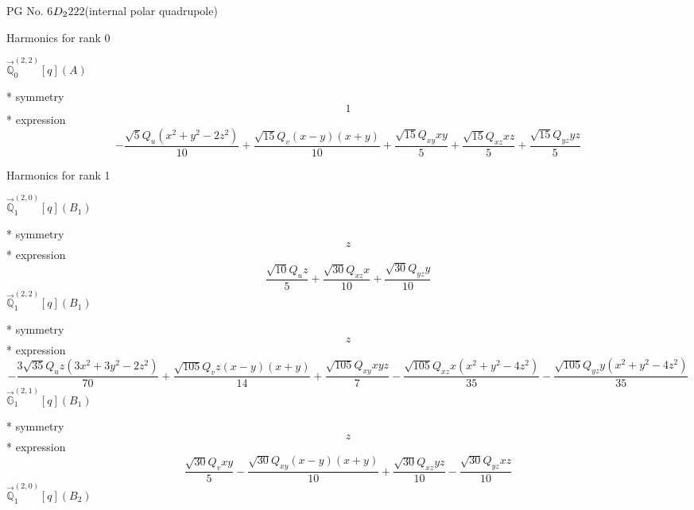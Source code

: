 \documentclass[fleqn,8pt]{jsarticle}
\begin{document}
\setcounter{MaxMatrixCols}{32}

\renewcommand{\tablename}{Table~}
\renewcommand{\figurename}{Figure~}
\begin{center}
\LARGE
PG No. 6\quad$D_{\rm 2}$\quad$222$\quad[ orthorhombic ] (internal polar quadrupole)
\end{center}

\noindent * Harmonics for rank 0

\noindent\quad $\vec{\mathbb{Q}}_{0}^{(2,2)}[q](A)$

\noindent\quad ** symmetry
\begin{dmath*}
1
\end{dmath*}
\noindent\quad ** expression
\begin{dmath*}
- \frac{\sqrt{5} Q_{u} \left(x^{2} + y^{2} - 2 z^{2}\right)}{10} + \frac{\sqrt{15} Q_{v} \left(x - y\right) \left(x + y\right)}{10} + \frac{\sqrt{15} Q_{xy} x y}{5} + \frac{\sqrt{15} Q_{xz} x z}{5} + \frac{\sqrt{15} Q_{yz} y z}{5}
\end{dmath*}

\noindent * Harmonics for rank 1

\noindent\quad $\vec{\mathbb{Q}}_{1}^{(2,0)}[q](B_{1})$

\noindent\quad ** symmetry
\begin{dmath*}
z
\end{dmath*}
\noindent\quad ** expression
\begin{dmath*}
\frac{\sqrt{10} Q_{u} z}{5} + \frac{\sqrt{30} Q_{xz} x}{10} + \frac{\sqrt{30} Q_{yz} y}{10}
\end{dmath*}
\noindent\quad $\vec{\mathbb{Q}}_{1}^{(2,2)}[q](B_{1})$

\noindent\quad ** symmetry
\begin{dmath*}
z
\end{dmath*}
\noindent\quad ** expression
\begin{dmath*}
- \frac{3 \sqrt{35} Q_{u} z \left(3 x^{2} + 3 y^{2} - 2 z^{2}\right)}{70} + \frac{\sqrt{105} Q_{v} z \left(x - y\right) \left(x + y\right)}{14} + \frac{\sqrt{105} Q_{xy} x y z}{7} - \frac{\sqrt{105} Q_{xz} x \left(x^{2} + y^{2} - 4 z^{2}\right)}{35} - \frac{\sqrt{105} Q_{yz} y \left(x^{2} + y^{2} - 4 z^{2}\right)}{35}
\end{dmath*}
\noindent\quad $\vec{\mathbb{G}}_{1}^{(2,1)}[q](B_{1})$

\noindent\quad ** symmetry
\begin{dmath*}
z
\end{dmath*}
\noindent\quad ** expression
\begin{dmath*}
\frac{\sqrt{30} Q_{v} x y}{5} - \frac{\sqrt{30} Q_{xy} \left(x - y\right) \left(x + y\right)}{10} + \frac{\sqrt{30} Q_{xz} y z}{10} - \frac{\sqrt{30} Q_{yz} x z}{10}
\end{dmath*}
\noindent\quad $\vec{\mathbb{Q}}_{1}^{(2,0)}[q](B_{2})$
\end{document}
